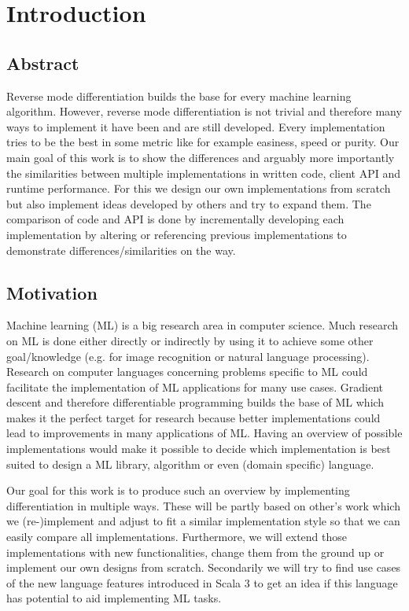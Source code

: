 \chapter{Introduction}

\section{Abstract}
Reverse mode differentiation builds the base for every machine learning algorithm. However, reverse mode differentiation is not trivial and therefore many ways to implement it have been and are still developed. Every implementation tries to be the best in some metric like for example easiness, speed or purity. Our main goal of this work is to show the differences and arguably more importantly the similarities between multiple implementations in written code, client API and runtime performance. For this we design our own implementations from scratch but also implement ideas developed by others and try to expand them. The comparison of code and API is done by incrementally developing each implementation by altering or referencing previous implementations to demonstrate differences/similarities on the way.

\section{Motivation}
Machine learning (ML) is a big research area in computer science. Much research on ML is done either directly or indirectly by using it to achieve some other goal/knowledge (e.g. for image recognition or natural language processing). Research on computer languages concerning problems specific to ML could facilitate the implementation of ML applications for many use cases.  Gradient descent and therefore differentiable programming builds the base of ML which makes it the perfect target for research because better implementations could lead to improvements in many applications of ML. Having an overview of possible implementations would make it possible to decide which implementation is best suited to design a ML library, algorithm or even (domain specific) language.

Our goal for this work is to produce such an overview by implementing differentiation in multiple ways. These will be partly based on other's work which we (re-)implement and adjust to fit a similar implementation style so that we can easily compare all implementations. Furthermore, we will extend those implementations with new functionalities, change them from the ground up or implement our own designs from scratch. Secondarily we will try to find use cases of the new language features introduced in Scala 3 to get an idea if this language has potential to aid implementing ML tasks.

